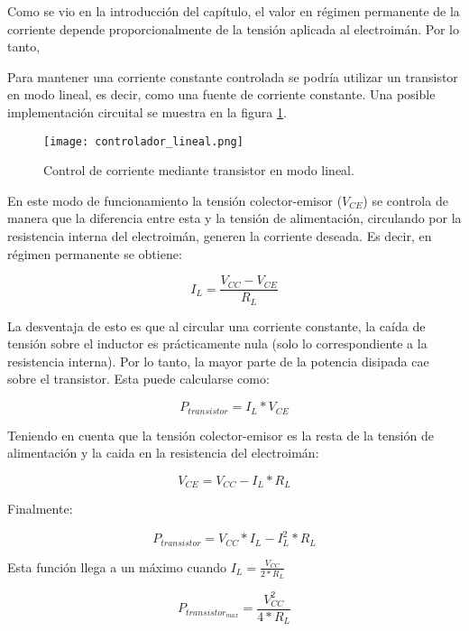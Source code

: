 Como se vio en la introducción del capítulo, el valor en régimen permanente de la corriente depende proporcionalmente de la tensión aplicada al electroimán. Por lo tanto, 

Para mantener una corriente constante controlada se podría utilizar un transistor en modo lineal, es decir, como una fuente de corriente constante. Una posible implementación circuital se muestra en la figura \ref{fig:img_controlador-lineal}.

\begin{figure}[H]
	\centering
	\texttt{[image: controlador\_lineal.png]}
	\caption{Control de corriente mediante transistor en modo lineal.}
	\label{fig:img_controlador-lineal}
\end{figure}

En este modo de funcionamiento la tensión colector-emisor ($V_{CE}$) se controla de manera que la diferencia entre esta y la tensión de alimentación, circulando por la resistencia interna del electroimán, generen la corriente deseada. Es decir, en régimen permanente se obtiene:
 
 \begin{equation} \label{eq_corriente_temporal}
 	I_L=\frac{V_{CC}-V_{CE}}{R_L}
 \end{equation}
 
La desventaja de esto es que al circular una corriente constante, la caída de tensión sobre el inductor es prácticamente nula (solo lo correspondiente a la resistencia interna). Por lo tanto, la mayor parte de la potencia disipada cae sobre el transistor. Esta puede calcularse como: 

\begin{equation}
	P_{transistor} = I_L*V_{CE}
\end{equation}

Teniendo en cuenta que la tensión colector-emisor es la resta de la tensión de alimentación y la caida en la resistencia del electroimán:

\begin{equation}
	V_{CE}=V_{CC}-I_L*R_L
\end{equation}

Finalmente:

\begin{equation}
	P_{transistor}=V_{CC}*I_L-I_L^2*R_L
\end{equation}

Esta función llega a un máximo cuando $I_L=\frac{V_{CC}}{2*R_L}$


\begin{equation}\label{eq_pot_transistor_lineal_final}
	P_{transistor_{max}}=\frac{V_{CC}^2}{4*R_L}
\end{equation}

